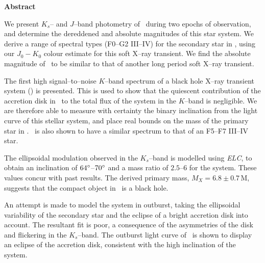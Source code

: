 
\begin{center}
\Large{\textbf{Abstract}}
\end{center}

\vspace{\myparskip}

We present $K_s$-- and $J$--band photometry of \groj\ during two epochs
of observation, and determine the dereddened and absolute magnitudes
of this star system. We derive a range of spectral types (F0--G2 III--IV) for the secondary star
in \groj, using our $J_{0}-K_{0}$ colour estimate for this soft X--ray transient. We find the absolute
magnitude of \groj\ to be similar to that of another long period soft
X--ray transient. %

\vspace{\myparskip}

The first high signal--to--noise $K$--band spectrum of a black hole X--ray
transient system (\groj) is presented. This is used to show that the quiescent contribution of the accretion disk in \groj\
to the total flux of the system in the $K$--band is negligible. We are
therefore able to measure with certainty the binary inclination from the light curve of this stellar system, and place real bounds on the mass of the primary star in \groj. \groj\ is also shown to have
a similar spectrum to that of an F5--F7 III--IV star. %

\vspace{\myparskip}

The ellipsoidal modulation observed in the $K_s$--band is modelled
using \textit{ELC}, to obtain an inclination of $64\hbox{$^\circ$}$--$70\hbox{$^\circ$}$ and a mass ratio of $2.5$--$6$ for the system. These values concur with past results. The derived primary mass, $M_X =
6.8\pm0.7$\,M\sun, suggests that the compact object in \groj\ is a black
hole. %

\vspace{\myparskip}

An attempt is made to model the system in outburst, taking the
ellipsoidal variability of the secondary star and the eclipse of a bright
accretion disk into account. The resultant fit is poor, a consequence
of the asymmetries of the disk and flickering in the $K_s$--band. The
outburst light curve of \groj\ is shown to display an eclipse of the
accretion disk, consistent with the high inclination of the system. %
